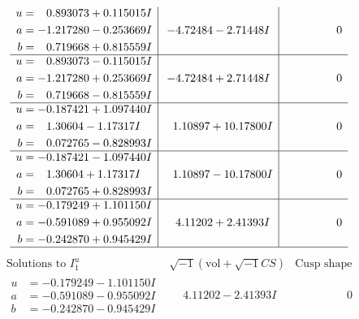 \documentclass[1p]{elsarticle_modified}
\theoremstyle{definition}
\newcommand{\I}{\sqrt{-1}}
\begin{document}
$$\begin{array}{c|c|c}
\begin{aligned}
u &= \phantom{-}0.893073 + 0.115015 I \\
a &= -1.217280 - 0.253669 I \\
b &= \phantom{-}0.719668 + 0.815559 I\end{aligned}
 & -4.72484 - 2.71448 I & \phantom{-0.000000 } 0 \\ \hline\begin{aligned}
u &= \phantom{-}0.893073 - 0.115015 I \\
a &= -1.217280 + 0.253669 I \\
b &= \phantom{-}0.719668 - 0.815559 I\end{aligned}
 & -4.72484 + 2.71448 I & \phantom{-0.000000 } 0 \\ \hline\begin{aligned}
u &= -0.187421 + 1.097440 I \\
a &= \phantom{-}1.30604 - 1.17317 I \\
b &= \phantom{-}0.072765 - 0.828993 I\end{aligned}
 & \phantom{-}1.10897 + 10.17800 I & \phantom{-0.000000 } 0 \\ \hline\begin{aligned}
u &= -0.187421 - 1.097440 I \\
a &= \phantom{-}1.30604 + 1.17317 I \\
b &= \phantom{-}0.072765 + 0.828993 I\end{aligned}
 & \phantom{-}1.10897 - 10.17800 I & \phantom{-0.000000 } 0 \\ \hline\begin{aligned}
u &= -0.179249 + 1.101150 I \\
a &= -0.591089 + 0.955092 I \\
b &= -0.242870 + 0.945429 I\end{aligned}
 & \phantom{-}4.11202 + 2.41393 I & \phantom{-0.000000 } 0\\
 \hline 
 \end{array}$$\newpage$$\begin{array}{c|c|c}  
\text{Solutions to }I^u_{1}& \I (\text{vol} + \sqrt{-1}CS) & \text{Cusp shape}\\
 \hline 
\begin{aligned}
u &= -0.179249 - 1.101150 I \\
a &= -0.591089 - 0.955092 I \\
b &= -0.242870 - 0.945429 I\end{aligned}
 & \phantom{-}4.11202 - 2.41393 I & \phantom{-0.000000 } 0 \\ \hline\begin{aligned}

\end{aligned}
\end{array}$$
\end{document}
